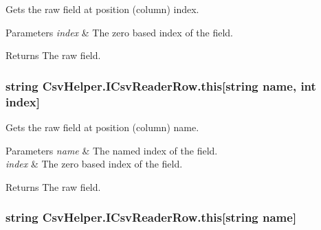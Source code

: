 Gets the raw field at position (column) index. 


\begin{DoxyParams}{Parameters}
{\em index} & The zero based index of the field.\\
\hline
\end{DoxyParams}
\begin{DoxyReturn}{Returns}
The raw field.
\end{DoxyReturn}
\hypertarget{a00091_abe611a2c471e6f11da579297bb876fb1}{
\subsubsection[{this[string name, int index]}]{\setlength{\rightskip}{0pt plus 5cm}string Csv\-Helper.\-I\-Csv\-Reader\-Row.\-this\mbox{[}string name, int index\mbox{]}\hspace{0.3cm}{\ttfamily [get]}}}\label{a00091_abe611a2c471e6f11da579297bb876fb1}


Gets the raw field at position (column) name. 


\begin{DoxyParams}{Parameters}
{\em name} & The named index of the field.\\
\hline
{\em index} & The zero based index of the field.\\
\hline
\end{DoxyParams}
\begin{DoxyReturn}{Returns}
The raw field.
\end{DoxyReturn}
\hypertarget{a00091_a999cf88bd8eb0b59c65b235cfe0e2835}{
\subsubsection[{this[string name]}]{\setlength{\rightskip}{0pt plus 5cm}string Csv\-Helper.\-I\-Csv\-Reader\-Row.\-this\mbox{[}string name\mbox{]}\hspace{0.3cm}{\ttfamily [get]}}}\label{a00091_a999cf88bd8eb0b59c65b235cfe0e2835}



